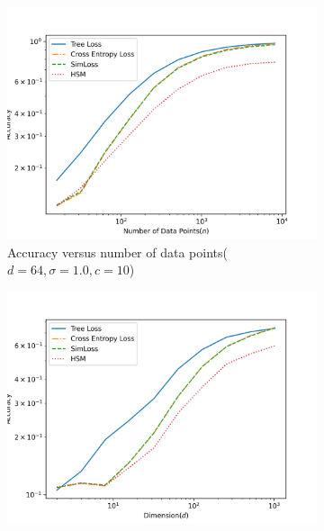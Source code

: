 \documentclass[twoside]{article}
\theoremstyle{definition}
\begin{document}
\begin{figure}
        \centering
        \begin{subfigure}[b]{0.45\textwidth}
            \centering
            \includegraphics[width=\textwidth]{fig/images/accuracy_vs_n.png}
            {{\small Accuracy versus number of data points($d=64, \sigma=1.0, c=10$)}}  
            \label{subfig.1}
        \end{subfigure}
        \hfill
        \begin{subfigure}[b]{0.45\textwidth}  
            \centering 
            \includegraphics[width=\textwidth]{fig/images/accuracy_vs_d.png}

\end{subfigure}
\end{figure}
\end{document}
